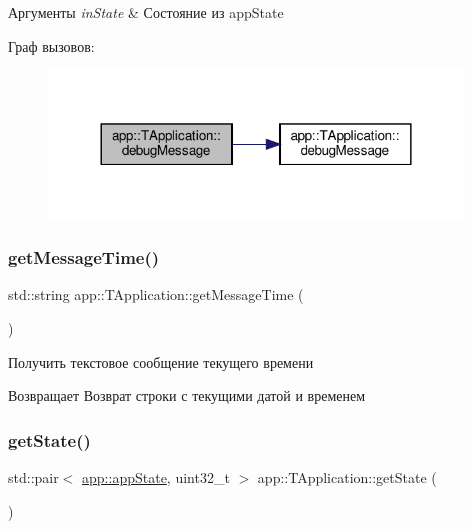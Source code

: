 \begin{DoxyParams}{Аргументы}
{\em in\+State} & Состояние из app\+State \\
\hline
\end{DoxyParams}
Граф вызовов\+:\nopagebreak
\begin{figure}[H]
\begin{center}
\leavevmode
\includegraphics[width=312pt]{classapp_1_1_t_application_ade46529292a73f5184abb54b135c4a2e_cgraph}
\end{center}
\end{figure}
\mbox{\label{classapp_1_1_t_application_aa2cb4a923a937f1a47a28fb5efe3b943}} 
\subsubsection{\texorpdfstring{get\+Message\+Time()}{getMessageTime()}}
{\footnotesize\ttfamily std\+::string app\+::\+T\+Application\+::get\+Message\+Time (\begin{DoxyParamCaption}{ }\end{DoxyParamCaption})}



Получить текстовое сообщение текущего времени 

\begin{DoxyReturn}{Возвращает}
Возврат строки с текущими датой и временем 
\end{DoxyReturn}
\mbox{\label{classapp_1_1_t_application_a254728135b699d84f82a334708b1fbda}} 
\subsubsection{\texorpdfstring{get\+State()}{getState()}}
{\footnotesize\ttfamily std\+::pair$<$ \hyperlink{group___xD0_x9F_xD0_xB5_xD1_x80_xD0_xB5_xD1_x87_xD0_xB8_xD1_x81_xD0_xBB_xD0_xB5_xD0_xBD_xD0_xB8_xD1_x8F_ga290e8080c661e52c2f685fd4af148acf}{app\+::app\+State}, uint32\+\_\+t $>$ app\+::\+T\+Application\+::get\+State (\begin{DoxyParamCaption}{ }\end{DoxyParamCaption})}



